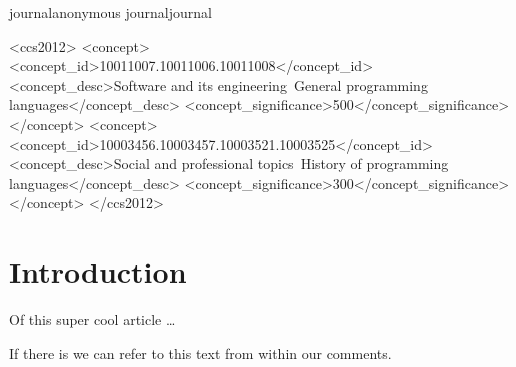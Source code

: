 \documentclass[sigplan]{acmart}
\def\acmversionanonymous{anonymous}
\def\acmversionjournal{journal}
\def\acmversion{anonymous}
\def\acmversion{journal}
\begin{document}
\ifx\acmversion\acmversionanonymous
{} %
\renewcommand\footnotetextcopyrightpermission[1]{} %
\fi
\ifx\acmversion\acmversionjournal
\begin{CCSXML}
<ccs2012>
<concept>
<concept_id>10011007.10011006.10011008</concept_id>
<concept_desc>Software and its engineering~General programming languages</concept_desc>
<concept_significance>500</concept_significance>
</concept>
<concept>
<concept_id>10003456.10003457.10003521.10003525</concept_id>
<concept_desc>Social and professional topics~History of programming languages</concept_desc>
<concept_significance>300</concept_significance>
</concept>
</ccs2012>
\end{CCSXML}


\fi

\maketitle

\section{Introduction}

Of this super cool article \ldots
{}

If there is  we can refer to this text from within our comments.
\end{document}
